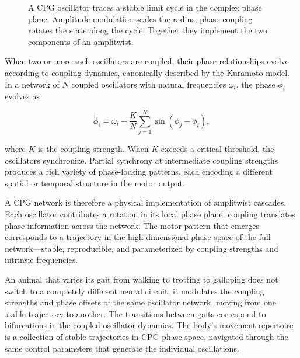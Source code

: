 \documentclass[11pt, a4paper]{article}
\theoremstyle{plain}
\theoremstyle{definition}
\theoremstyle{remark}
\begin{document}
\begin{figure}[h]
\centering
{}
\caption{A CPG oscillator traces a stable limit cycle in the complex phase plane.
Amplitude modulation scales the radius; phase coupling rotates the state along the cycle.
Together they implement the two components of an amplitwist.}
\end{figure}

When two or more such oscillators are coupled, their phase relationships evolve
according to coupling dynamics, canonically described by the Kuramoto model.
In a network of $N$ coupled oscillators with natural frequencies $\omega_i$,
the phase $\phi_i$ evolves as

\begin{equation}
\dot{\phi}_i = \omega_i + \frac{K}{N}\sum_{j=1}^{N}\sin(\phi_j - \phi_i),
\label{eq:kuramoto}
\end{equation}

where $K$ is the coupling strength. When $K$ exceeds a critical threshold, the
oscillators synchronize. Partial synchrony at intermediate coupling strengths produces
a rich variety of phase-locking patterns, each encoding a different spatial or temporal
structure in the motor output.

A CPG network is therefore a physical implementation of amplitwist cascades. Each
oscillator contributes a rotation in its local phase plane; coupling translates phase
information across the network. The motor pattern that emerges corresponds to a
trajectory in the high-dimensional phase space of the full network---stable, reproducible,
and parameterized by coupling strengths and intrinsic frequencies.

An animal that varies its gait from walking to trotting to galloping does not switch to
a completely different neural circuit; it modulates the coupling strengths and phase
offsets of the same oscillator network, moving from one stable trajectory to another.
The transitions between gaits correspond to bifurcations in the coupled-oscillator
dynamics. The body's movement repertoire is a collection of stable trajectories in CPG
phase space, navigated through the same control parameters that generate the individual
oscillations.
\end{document}
